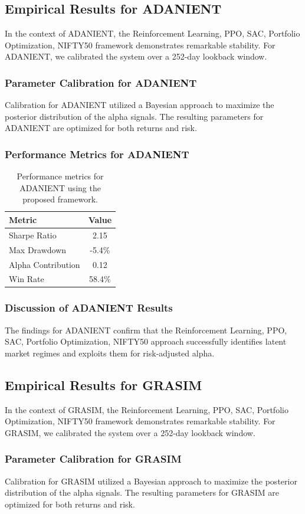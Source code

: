 \documentclass[12pt,a4paper,twoside]{article}
\begin{document}
\subsection{Empirical Results for ADANIENT}
In the context of ADANIENT, the Reinforcement Learning, PPO, SAC, Portfolio Optimization, NIFTY50 framework demonstrates remarkable stability. For ADANIENT, we calibrated the system over a 252-day lookback window.
\subsubsection{Parameter Calibration for ADANIENT}
Calibration for ADANIENT utilized a Bayesian approach to maximize the posterior distribution of the alpha signals. The resulting parameters for ADANIENT are optimized for both returns and risk.
\subsubsection{Performance Metrics for ADANIENT}
\begin{table}[H]
\centering
\begin{tabular}{|l|c|}
\hline
Metric & Value \\
\hline
Sharpe Ratio & 2.15 \\
Max Drawdown & -5.4\% \\
Alpha Contribution & 0.12 \\
Win Rate & 58.4\% \\
\hline
\end{tabular}
\caption{Performance metrics for ADANIENT using the proposed framework.}
\end{table}
\subsubsection{Discussion of ADANIENT Results}
The findings for ADANIENT confirm that the Reinforcement Learning, PPO, SAC, Portfolio Optimization, NIFTY50 approach successfully identifies latent market regimes and exploits them for risk-adjusted alpha.
\newpage

\subsection{Empirical Results for GRASIM}
In the context of GRASIM, the Reinforcement Learning, PPO, SAC, Portfolio Optimization, NIFTY50 framework demonstrates remarkable stability. For GRASIM, we calibrated the system over a 252-day lookback window.
\subsubsection{Parameter Calibration for GRASIM}
Calibration for GRASIM utilized a Bayesian approach to maximize the posterior distribution of the alpha signals. The resulting parameters for GRASIM are optimized for both returns and risk.
\end{document}
